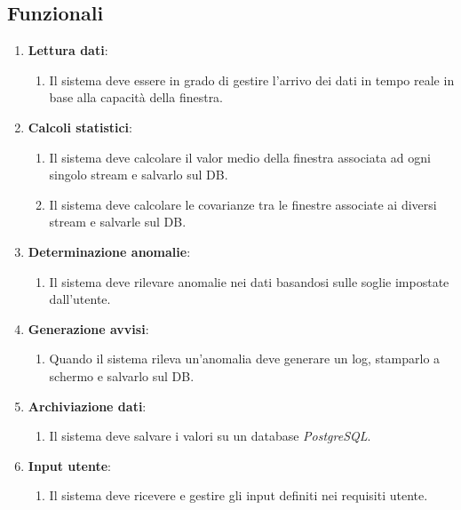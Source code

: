 \documentclass{article}
\begin{document}
\subsection{Funzionali}

\begin{enumerate}
	
	\item \textbf{Lettura dati}:
	      \begin{enumerate}[label*=\arabic*.]
	      	\item Il sistema deve essere in grado di gestire l'arrivo dei dati in tempo reale in base alla capacità della finestra.
	      \end{enumerate}
	      
	\item \textbf{Calcoli statistici}:
	      \begin{enumerate}[label*=\arabic*.]
	      	\item Il sistema deve calcolare il valor medio della finestra associata ad ogni singolo stream e salvarlo sul DB.
	      	              
	      	\item Il sistema deve calcolare le covarianze tra le finestre associate ai diversi stream e salvarle sul DB.
	      \end{enumerate}

	\item \textbf{Determinazione anomalie}:
	      \begin{enumerate}[label*=\arabic*.]
	      	\item Il sistema deve rilevare anomalie nei dati basandosi sulle soglie impostate dall'utente.
	      \end{enumerate}

	\item \textbf{Generazione avvisi}:
	      \begin{enumerate}[label*=\arabic*.]
	      	\item Quando il sistema rileva un'anomalia deve generare un log, stamparlo a schermo e salvarlo sul DB.
	      \end{enumerate}

	\item \textbf{Archiviazione dati}:
	      \begin{enumerate}[label*=\arabic*.]
	      	\item Il sistema deve salvare i valori su un database \textit{PostgreSQL}.
	      \end{enumerate}

	\item \textbf{Input utente}:
	      \begin{enumerate}[label*=\arabic*.]
	      	\item Il sistema deve ricevere e gestire gli input definiti nei requisiti utente.
	      \end{enumerate}    
	          
\end{enumerate}
\end{document}
